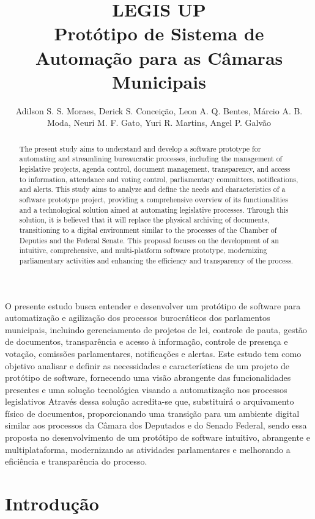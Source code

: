 \documentclass[12pt]{article}
\title{LEGIS UP\\ Protótipo de Sistema de Automação para as Câmaras Municipais}
\author{Adilson S. S. Moraes\inst{1}, Derick S. Conceição\inst{1}, Leon A. Q. Bentes\inst{1}, Márcio A. B. Moda\inst{1}, Neuri M. F. Gato\inst{1}, Yuri R. Martins\inst{1}, Angel P. Galvão\inst{1}}
\begin{document}
  

\maketitle

\begin{abstract}
  The present study aims to understand and develop a software prototype for automating and streamlining bureaucratic processes, including the management of legislative projects, agenda control, document management, transparency, and access to information, attendance and voting control, parliamentary committees, notifications, and alerts. This study aims to analyze and define the needs and characteristics of a software prototype project, providing a comprehensive overview of its functionalities and a technological solution aimed at automating legislative processes. Through this solution, it is believed that it will replace the physical archiving of documents, transitioning to a digital environment similar to the processes of the Chamber of Deputies and the Federal Senate. This proposal focuses on the development of an intuitive, comprehensive, and multi-platform software prototype, modernizing parliamentary activities and enhancing the efficiency and transparency of the process.
\end{abstract}
     
\begin{resumo} 
  O presente estudo busca entender e desenvolver um protótipo de software para automatização e agilização dos processos burocráticos dos parlamentos municipais, incluindo gerenciamento de projetos de lei, controle de pauta, gestão de documentos, transparência e acesso à informação, controle de presença e votação, comissões parlamentares, notificações e alertas. Este estudo tem como objetivo analisar e definir as necessidades e características de um projeto de protótipo de software, fornecendo uma visão abrangente das funcionalidades presentes e uma solução tecnológica visando a automatização nos processos legislativos Através dessa solução acredita-se que, substituirá o arquivamento físico de documentos, proporcionando uma transição para um ambiente digital similar aos processos da Câmara dos Deputados e do Senado Federal, sendo essa proposta no desenvolvimento de um protótipo de software intuitivo, abrangente e multiplataforma, modernizando as atividades parlamentares e melhorando a eficiência e transparência do processo.
\end{resumo}


\section{Introdução}
\end{document}
